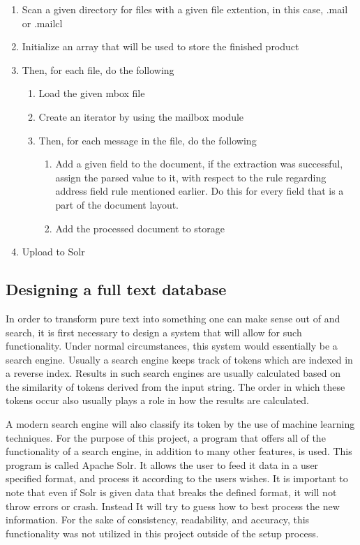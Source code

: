 \documentclass[a4paper,english]{report}
\begin{document}
\begin{enumerate}
	\item Scan a given directory for files with a given file extention, in this case, .mail or .mailcl
	\item Initialize an array that will be used to store the finished product 
	\item Then, for each file, do the following
\begin{enumerate}

\item Load the given mbox file 
\item Create an iterator by using the mailbox module 
\item Then, for each message in the file, do the following 
\begin{enumerate}


	\item Add a given field to the document, if the extraction was successful, assign the parsed value to it, with respect to the rule regarding address field rule  mentioned earlier. Do this 		            for every field that is a part of the document layout.

          \item Add the processed document to storage 
 	


\end{enumerate}
\end{enumerate}
	

	\item Upload to Solr	
\end{enumerate}


  \subsection{Designing a full text database}
In order to transform pure text into something one can make sense out of and search, it is first necessary to design a system that will allow for such functionality. Under normal circumstances, this system would essentially be a search engine. Usually a search engine keeps track of  tokens which are indexed in a reverse index. Results in such search engines are usually calculated based on the similarity of tokens derived from the input string. The order in which these tokens occur also usually plays a role in how the results are calculated.

A modern search engine will also classify its token by the use of machine learning techniques.
For the purpose of this project, a program that offers all of the functionality of a search engine, in addition to many other features, is used. This program is called Apache Solr. It allows the user to feed it data in a user specified format, and process it according to the users wishes. It is important to note that even if Solr is given data that  breaks the defined format, it will not throw errors or crash. Instead It will try to guess how to best process the new information. For the sake of consistency, readability, and accuracy, this functionality was not utilized in this project outside of the setup process. 
\end{document}
